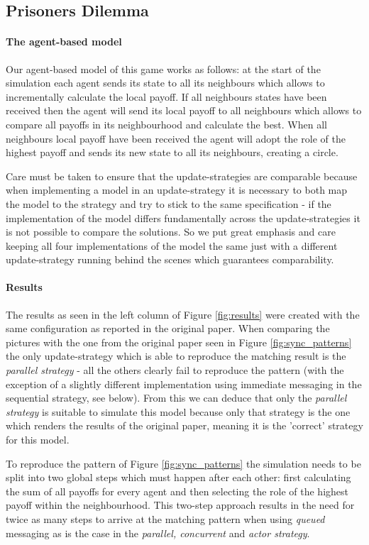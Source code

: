 \subsection{Prisoners Dilemma}
\paragraph{The agent-based model}
Our agent-based model of this game works as follows: at the start of the simulation each agent sends its state to all its neighbours which allows to incrementally calculate the local payoff. If all neighbours states have been received then the agent will send its local payoff to all neighbours which allows to compare all payoffs in its neighbourhood and calculate the best. When all neighbours local payoff have been received the agent will adopt the role of the highest payoff and sends its new state to all its neighbours, creating a circle. 

Care must be taken to ensure that the update-strategies are comparable because when implementing a model in an update-strategy it is necessary to both map the model to the strategy and try to stick to the same specification - if the implementation of the model differs fundamentally across the update-strategies it is not possible to compare the solutions. So we put great emphasis and care keeping all four implementations of the model the same just with a different update-strategy running behind the scenes which guarantees comparability.

\paragraph{Results}
The results as seen in the left column of Figure \ref{fig:results} were created with the same configuration as reported in the original paper. When comparing the pictures with the one from the original paper seen in Figure \ref{fig:sync_patterns} the only update-strategy which is able to reproduce the matching result is the \textit{parallel strategy} - all the others clearly fail to reproduce the pattern (with the exception of a slightly different implementation using immediate messaging in the sequential strategy, see below). From this we can deduce that only the \textit{parallel strategy} is suitable to simulate this model because only that strategy is the one which renders the results of the original paper, meaning it is the 'correct' strategy for this model. 

To reproduce the pattern of Figure \ref{fig:sync_patterns} the simulation needs to be split into two global steps which must happen after each other: first calculating the sum of all payoffs for every agent and then selecting the role of the highest payoff within the neighbourhood. This two-step approach results in the need for twice as many steps to arrive at the matching pattern when using \textit{queued} messaging as is the case in the \textit{parallel, concurrent} and \textit{actor strategy}.

